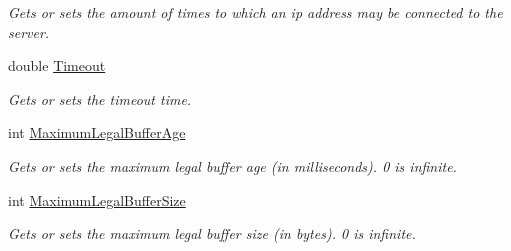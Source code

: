 \begin{DoxyCompactItemize}
\begin{DoxyCompactList}\small\item\em Gets or sets the amount of times to which an ip address may be connected to the server. \end{DoxyCompactList}\item 
\hypertarget{classAsterion_1_1Server_a17f872487518e6756d5b089dbcda7268}{double \hyperlink{classAsterion_1_1Server_a17f872487518e6756d5b089dbcda7268}{Timeout}}\label{classAsterion_1_1Server_a17f872487518e6756d5b089dbcda7268}

\begin{DoxyCompactList}\small\item\em Gets or sets the timeout time. \end{DoxyCompactList}\item 
\hypertarget{classAsterion_1_1Server_ace4f1bb6b79712ee78198c187b6ead84}{int \hyperlink{classAsterion_1_1Server_ace4f1bb6b79712ee78198c187b6ead84}{Maximum\-Legal\-Buffer\-Age}}\label{classAsterion_1_1Server_ace4f1bb6b79712ee78198c187b6ead84}

\begin{DoxyCompactList}\small\item\em Gets or sets the maximum legal buffer age (in milliseconds). 0 is infinite. \end{DoxyCompactList}\item 
\hypertarget{classAsterion_1_1Server_aadb0c4b83cd66978060719b3c9f9bd59}{int \hyperlink{classAsterion_1_1Server_aadb0c4b83cd66978060719b3c9f9bd59}{Maximum\-Legal\-Buffer\-Size}}\label{classAsterion_1_1Server_aadb0c4b83cd66978060719b3c9f9bd59}

\begin{DoxyCompactList}\small\item\em Gets or sets the maximum legal buffer size (in bytes). 0 is infinite. \end{DoxyCompactList}\end{DoxyCompactItemize}
